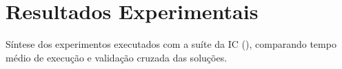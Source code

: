 \section{Resultados Experimentais}\label{sec:resultados}

Síntese dos experimentos executados com a suíte da IC (), comparando tempo médio de execução e validação cruzada das soluções.


